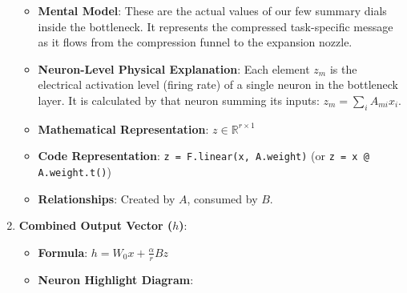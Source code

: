 \begin{enumerate}
\begin{itemize}
      \item \textbf{Mental Model}: These are the actual values of our few summary dials inside the bottleneck. It represents the compressed task-specific message as it flows from the compression funnel to the expansion nozzle.
      \item \textbf{Neuron-Level Physical Explanation}: Each element $z_m$ is the electrical activation level (firing rate) of a single neuron in the bottleneck layer. It is calculated by that neuron summing its inputs: $z_m = \sum_i A_{mi} x_i$.
      \item \textbf{Mathematical Representation}: $z \in \mathbb{R}^{r \times 1}$
      \item \textbf{Code Representation}: \texttt{z = F.linear(x, A.weight)} (or \texttt{z = x @ A.weight.t()})
      \item \textbf{Relationships}: Created by $A$, consumed by $B$.
    \end{itemize}

  \item \textbf{Combined Output Vector ($h$)}:
    \begin{itemize}
      \item \textbf{Formula}: $h = W_0 x + \frac{\alpha}{r} B z$
      \item \textbf{Neuron Highlight Diagram}:

\begin{center}
\begin{adjustbox}{max width=0.85\linewidth}
\end{adjustbox}
\end{center}
\end{itemize}
\end{enumerate}
